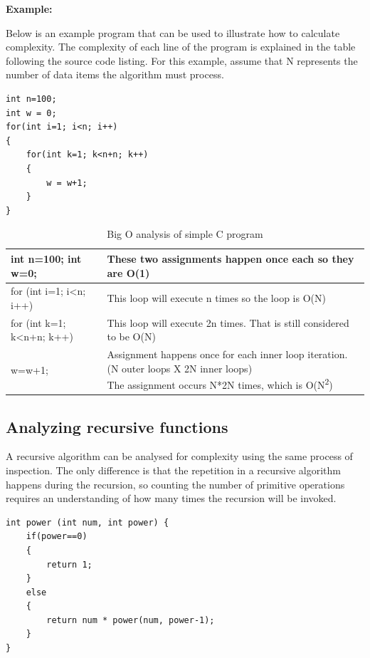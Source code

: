 \textbf{Example:}

Below is an example program that can be used to illustrate how to
calculate complexity. The complexity of each line of the program is
explained in the table following the source code listing. For this example, assume that N represents the
number of data items the algorithm must process.

\begin{center}
\begin{lstlisting}
int n=100;
int w = 0;
for(int i=1; i<n; i++)
{
	for(int k=1; k<n+n; k++)
	{
		w = w+1;
	}
}
\end{lstlisting}

\begin{table}[h]
\caption{Big O analysis of simple C program}
\begin{tabular}{l || l}
int n=100; int w=0;& These two assignments happen once each so they are O(1)\\ \hline
for (int i=1; i\textless n; i++) & This loop will execute n times so the loop is O(N)\\\hline
for (int k=1; k\textless n+n; k++) & This loop will execute 2n times.  That is still considered to be O(N)\\\hline
{  w=w+1;} & \specialcell[]{Assignment happens once for each inner loop iteration. (N outer loops X 2N inner loops) \\The assignment occurs N*2N times, which is O(N\textsuperscript{2})}\\\hline\hline
\end{tabular}

\end{table}
\end{center}

\subsection{Analyzing recursive functions}

A recursive algorithm can be analysed for complexity using the same process of inspection.   The only difference is that the repetition in a recursive algorithm happens during the recursion,  so counting the number of primitive operations requires an understanding of how many times the recursion will be invoked.

\begin{lstlisting}
int power (int num, int power) {
    if(power==0)
    {
        return 1;
    }
    else
    {
        return num * power(num, power-1);
    }
}
\end{lstlisting}

